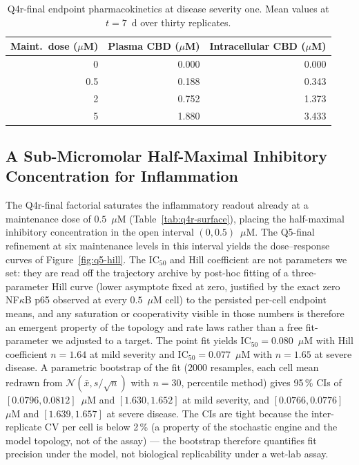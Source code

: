 \documentclass[10pt,letterpaper]{article}
\begin{document}
\begin{table}[htbp]
\centering
\caption{Q4r-final endpoint pharmacokinetics at disease severity one. Mean values at $t = 7$~d over thirty replicates.}
\label{tab:q4r-pk}
\begin{tabular}{rrr}
\toprule
Maint.\ dose ($\mu$M) & Plasma CBD ($\mu$M) & Intracellular CBD ($\mu$M) \\
\midrule
0    & 0.000 & 0.000 \\
0.5  & 0.188 & 0.343 \\
2    & 0.752 & 1.373 \\
5    & 1.880 & 3.433 \\
\bottomrule
\end{tabular}
\end{table}

\subsection{A Sub-Micromolar Half-Maximal Inhibitory Concentration for Inflammation}
\label{sec:r-q5}

The Q4r-final factorial saturates the inflammatory readout already at a maintenance dose of $0.5$~$\mu$M (Table~\ref{tab:q4r-surface}), placing the half-maximal inhibitory concentration in the open interval $(0, 0.5)$~$\mu$M. The Q5-final refinement at six maintenance levels in this interval yields the dose--response curves of Figure~\ref{fig:q5-hill}. The IC$_{50}$ and Hill coefficient are not parameters we set: they are read off the trajectory archive by post-hoc fitting of a three-parameter Hill curve (lower asymptote fixed at zero, justified by the exact zero NF$\kappa$B p65 observed at every $0.5$~$\mu$M cell) to the persisted per-cell endpoint means, and any saturation or cooperativity visible in those numbers is therefore an emergent property of the topology and rate laws rather than a free fit-parameter we adjusted to a target. The point fit yields IC$_{50} = 0.080$~$\mu$M with Hill coefficient $n = 1.64$ at mild severity and IC$_{50} = 0.077$~$\mu$M with $n = 1.65$ at severe disease. A parametric bootstrap of the fit (2000 resamples, each cell mean redrawn from $\mathcal{N}(\bar{x}, s/\sqrt{n})$ with $n=30$, percentile method) gives 95\,\% CIs of $[0.0796, 0.0812]$~$\mu$M and $[1.630, 1.652]$ at mild severity, and $[0.0766, 0.0776]$~$\mu$M and $[1.639, 1.657]$ at severe disease. The CIs are tight because the inter-replicate CV per cell is below 2\,\% (a property of the stochastic engine and the model topology, not of the assay) --- the bootstrap therefore quantifies fit precision under the model, not biological replicability under a wet-lab assay.
\end{document}
